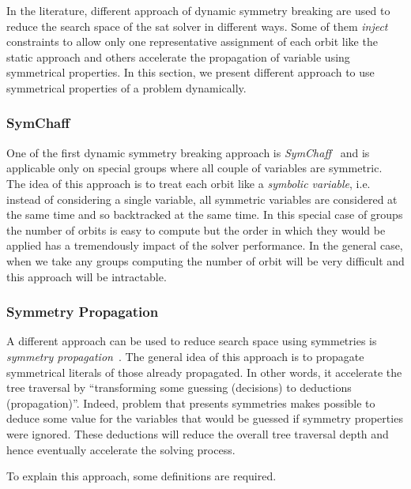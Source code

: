 In the literature, different approach of dynamic symmetry breaking are used to reduce the search space
of the sat solver in different ways. Some of them \textit{inject} constraints to allow only one representative assignment of each orbit like the static approach and others accelerate the propagation of variable using symmetrical properties. In this section, we present different approach to use symmetrical properties of a problem 
dynamically.


\subsubsection{SymChaff}

One of the first dynamic symmetry breaking approach is \emph{SymChaff}~\cite{sabharwal2005symchaff}
and is applicable only on special groups where all couple of variables are symmetric.
The idea of this approach is to treat each orbit like a \emph{symbolic variable}, i.e. instead of considering a single
variable, all symmetric variables are considered at the same time and so backtracked at the same time.
In this special case of groups the number of orbits is easy to compute but the order in which they would be
applied has a tremendously impact of the solver performance.
In the general case, when we take any groups computing the number of orbit will be very difficult and this approach
will be intractable.


\subsubsection{Symmetry Propagation}

A different approach can be used to reduce search space using symmetries is \emph{symmetry propagation}~\cite{Devriendt12}.
The general idea of this approach is to propagate symmetrical literals of those already propagated.
In other words, it accelerate the tree traversal by ``transforming some guessing (decisions) to deductions (propagation)''.
Indeed, problem that presents symmetries makes possible to deduce some value 
for the variables that would be guessed if symmetry properties were ignored.
These deductions will reduce the overall tree traversal depth and hence eventually accelerate the solving process.

To explain this approach, some definitions are required.


